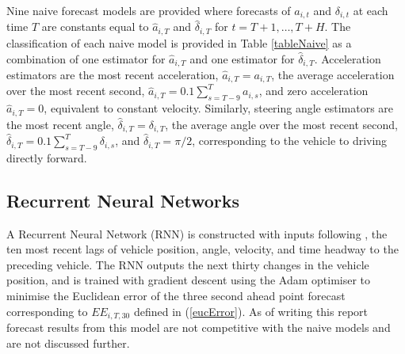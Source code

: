 \documentclass[12pt,a4paper]{article}\usepackage[]{graphicx}\usepackage[]{color}
\begin{document}
{Nine naive forecast models are provided where forecasts of $a_{i, t}$ and $\delta_{i, t}$ at each time $T$ are constants equal to $\hat{a}_{i, T}$ and $\hat{\delta}_{i, T}$ for $t = T+1, \dots, T+H$. The classification of each naive model is provided in Table \ref{tableNaive} as a combination of one estimator for $\hat{a}_{i, T}$ and one estimator for $\hat{\delta}_{i, T}$. Acceleration estimators are the most recent acceleration, $\hat{a}_{i, T} = a_{i, T}$, the average acceleration over the most recent second, $\hat{a}_{i, T} = 0.1 \sum_{s = T-9}^T a_{i, s}$, and zero acceleration $\hat{a}_{i, T} = 0$, equivalent to constant velocity. Similarly, steering angle estimators are the most recent angle, $\hat{\delta}_{i, T} = \delta_{i, T}$, the average angle over the most recent second, $\hat{\delta}_{i, T} = 0.1 \sum_{s = T - 9}^T \delta_{i, s}$, and $\hat{\delta}_{i, T} = \pi/2$, corresponding to the vehicle to driving directly forward.
\begin{table}
\begin{center}
\end{center}
\caption{Classification of naive forecast models by future acceleration and steering angle estimators.}
\label{tableNaive}
\end{table}

\subsection{Recurrent Neural Networks}
\label{subsec:RNN}
A Recurrent Neural Network (RNN) is constructed with inputs following \citet{Ding2013}, the ten most recent lags of vehicle position, angle, velocity, and time headway to the preceding vehicle. The RNN outputs the next thirty changes in the vehicle position, and is trained with gradient descent using the Adam optimiser to minimise the Euclidean error of the three second ahead point forecast corresponding to $EE_{i, T, 30}$ defined in (\ref{eucError}). As of writing this report forecast results from this model are not competitive with the naive models and are not discussed further.

}
\end{document}
